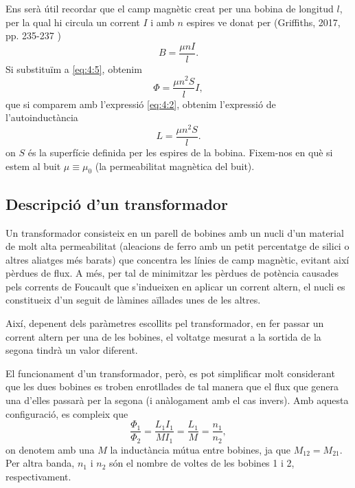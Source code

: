 \documentclass[a4paper,10.5pt]{report}
\begin{document}
Ens serà útil recordar que el camp magnètic creat per una bobina de longitud $l$, per la qual hi circula un corrent $I$ i amb $n$ espires ve donat per (Griffiths, 2017, pp. 235-237 \cite{ref4})
\begin{equation}
	B = \frac{\mu n I}{l}.
\end{equation}
Si substituïm a \ref{eq:4:5}, obtenim
\begin{equation}
	\Phi = \frac{\mu n^2 S}{l} I,
\end{equation}
que si comparem amb l'expressió \ref{eq:4:2}, obtenim l'expressió de l'autoinductància
\begin{equation}
	L = \frac{\mu n^2 S}{l}.
	\label{eq:4:100}
\end{equation}
on $S$ és la superfície definida per les espires de la bobina. Fixem-nos en què si estem al buit $\mu \equiv \mu_0$ (la permeabilitat magnètica del buit).

\subsection{Descripció d'un transformador}
Un transformador consisteix en un parell de bobines amb un nucli d'un material de molt alta permeabilitat (aleacions de ferro amb un petit percentatge de silici o altres aliatges més barats) que concentra les línies de camp magnètic, evitant així pèrdues de flux. A més, per tal de minimitzar les pèrdues de potència causades pels corrents de Foucault que s'indueixen en aplicar un corrent altern, el nucli es constitueix d'un seguit de làmines aïllades unes de les altres. 

Així, depenent dels paràmetres escollits pel transformador, en fer passar un corrent altern per una de les bobines, el voltatge mesurat a la sortida de la segona tindrà un valor diferent.

El funcionament d'un transformador, però, es pot simplificar molt considerant que les dues bobines es troben enrotllades de tal manera que el flux que genera una d'elles passarà per la segona (i anàlogament amb el cas invers). Amb aquesta configuració, es compleix que
\begin{equation}
	\frac{\Phi_1}{\Phi_2}=\frac{L_1I_1}{MI_1}=\frac{L_1}{M}=\frac{n_1}{n_2}, \label{eq:4:8}
\end{equation}
on denotem amb una $M$ la inductància mútua entre bobines, ja que $M_{12}=M_{21}$. Per altra banda, $n_1$ i $n_2$ són el nombre de voltes de les bobines 1 i 2, respectivament.
\end{document}
